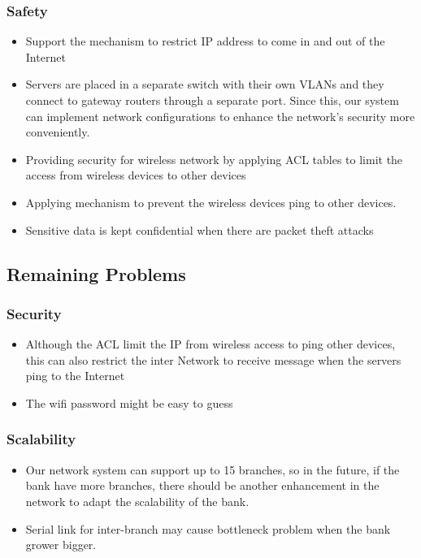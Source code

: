 \subsubsection{Safety}
\begin{itemize}
    \item Support the mechanism to restrict IP address to come in and out of the Internet
    \item Servers are placed in a separate switch with their own VLANs and they connect to gateway routers through a separate port. Since this, our system can implement network configurations to enhance the network's security more conveniently.
    \item Providing security for wireless network by  applying ACL tables to limit the access from wireless devices to other devices
    \item Applying mechanism to prevent the wireless devices ping to other devices.    
    \item Sensitive data is kept confidential when there are packet theft attacks
\end{itemize}

\subsection{Remaining Problems}
\subsubsection{Security}
\begin{itemize}
    \item Although the ACL limit the IP from wireless access to ping other devices, this can also restrict the inter Network to receive message when the servers ping to the Internet
    \item The wifi password might be easy to guess

\end{itemize}

\subsubsection{Scalability}
\begin{itemize}
    \item Our network system can support up to 15 branches, so in the future, if the bank have more branches, there should be another enhancement in the network to adapt the scalability of the bank.
    \item Serial link for inter-branch may cause bottleneck problem when the bank grower bigger.

\end{itemize}

